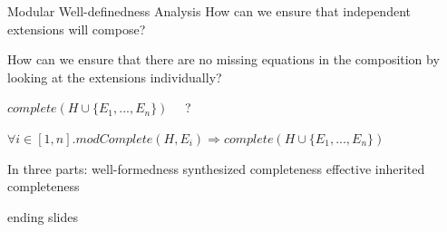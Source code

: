 \documentclass[11pt,aspectratio=169]{beamer}
\begin{document}
\begin{frame}[t]{Modular Well-definedness Analysis}
How can we ensure that independent extensions will compose?

\medskip
How can we ensure that there are no missing equations in the
composition by looking at the extensions individually?

\bigskip

$\mathit{complete} ( H \cup \{ E_1, ... , E_n \} ) $ \ \ ?

\bigskip

$\forall i \in [1,n] . \mathit{modComplete}(H, E_i) 
 \Rightarrow \mathit{complete}( H \cup \{ E_1, ..., E_n \} )$

\bigskip
In three parts:
\be
 \x well-formedness
 \x synthesized completeness
 \x effective inherited completeness
\ee
\end{frame}


\begin{frame}

ending slides
\end{frame}
\end{document}
